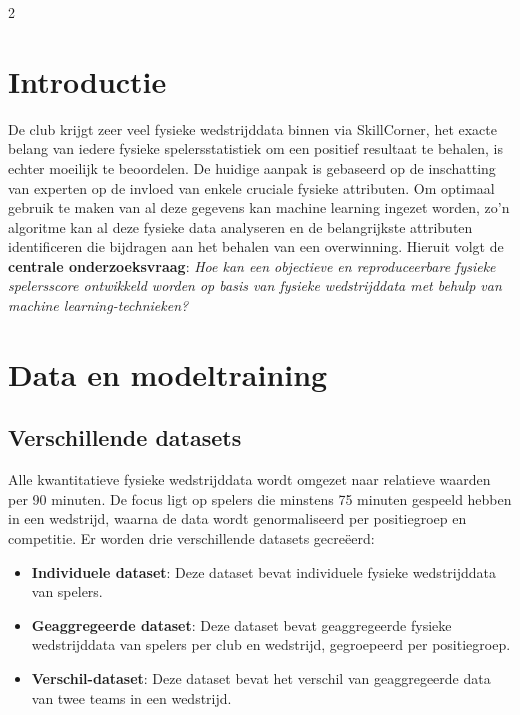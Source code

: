 \documentclass[a0,portrait]{hogent-poster}
\begin{document}
\begin{multicols}{2} %

\section{Introductie}

De club krijgt zeer veel fysieke wedstrijddata binnen via SkillCorner, het exacte belang van iedere fysieke spelersstatistiek om een positief resultaat te behalen, is echter moeilijk te beoordelen. De huidige aanpak is gebaseerd op de inschatting van experten op de invloed van enkele cruciale fysieke attributen. Om optimaal gebruik te maken van al deze gegevens kan machine learning ingezet worden, zo'n algoritme kan al deze fysieke data analyseren en de belangrijkste attributen identificeren die bijdragen aan het behalen van een overwinning. 
\newline \newline
Hieruit volgt de \textbf{centrale onderzoeksvraag}:
\newline \newline
\emph{Hoe kan een objectieve en reproduceerbare fysieke spelersscore ontwikkeld worden op basis van fysieke wedstrijddata met behulp van machine learning-technieken?} 

\section{Data en modeltraining}
\subsection{Verschillende datasets}
Alle kwantitatieve fysieke wedstrijddata wordt omgezet naar relatieve waarden per 90 minuten. De focus ligt op spelers die minstens 75 minuten gespeeld hebben in een wedstrijd, waarna de data wordt genormaliseerd per positiegroep en competitie. Er worden drie verschillende datasets gecreëerd:
\begin{itemize}
  \item \textbf{Individuele dataset}: Deze dataset bevat individuele fysieke wedstrijddata van spelers.
  \item \textbf{Geaggregeerde dataset}: Deze dataset bevat geaggregeerde fysieke wedstrijddata van spelers per club en wedstrijd, gegroepeerd per positiegroep.
  \item \textbf{Verschil-dataset}: Deze dataset bevat het verschil van geaggregeerde data van twee teams in een wedstrijd.
\end{itemize}

\end{multicols}
\end{document}

